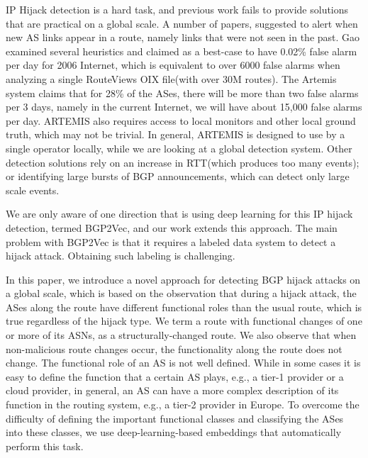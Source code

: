 \documentclass[10pt,journal]{IEEEtran}
\begin{document}
IP Hijack detection is a hard task, and previous work fails to provide solutions that are practical on a global scale. A number of papers\cite{sermezis2018artemis},\cite{gao2001inferring} suggested to alert when new AS links appear in a route, namely links that were not seen in the past. Gao\cite{gao2001inferring} examined several heuristics and claimed as a best-case to have 0.02\% false alarm per day for 2006 Internet, which is equivalent to over 6000 false alarms when analyzing a single RouteViews OIX file(with over 30M routes). The Artemis system\cite{sermezis2018artemis} claims that for 28\% of the ASes, there will be more than two false alarms per 3 days, namely in the current Internet, we will have about 15,000 false alarms per day. ARTEMIS also requires access to local monitors and other local ground truth, which may not be trivial. In general, ARTEMIS is designed to use by a single operator locally, while we are looking at a global detection system. Other detection solutions rely on an increase in RTT\cite{balu2016darshana}(which produces too many events); or identifying large bursts of BGP announcements\cite{moriano2021using}, which can detect only large scale events.

We are only aware of one direction that is using deep learning for this IP hijack detection, termed BGP2Vec\cite{shapira2020deep}, and our work extends this approach. The main problem with BGP2Vec is that it requires a labeled data system to detect a hijack attack. Obtaining such labeling is challenging.

In this paper, we introduce a novel approach for detecting BGP hijack attacks on a global scale, which is based on the observation that during a hijack attack, the ASes along the route have different functional roles than the usual route, which is true regardless of the hijack type. We term a route with functional changes of one or more of its ASNs, as a structurally-changed route. We also observe that when non-malicious route changes occur, the functionality along the route does not change. The functional role of an AS is not well defined. While in some cases it is easy to define the function that a certain AS plays, e.g., a tier-1 provider or a cloud provider, in general, an AS can have a more complex description of its function in the routing system, e.g., a tier-2 provider in Europe. To overcome the difficulty of defining the important functional classes and classifying the ASes into these classes, we use deep-learning-based embeddings that automatically perform this task.
\end{document}
